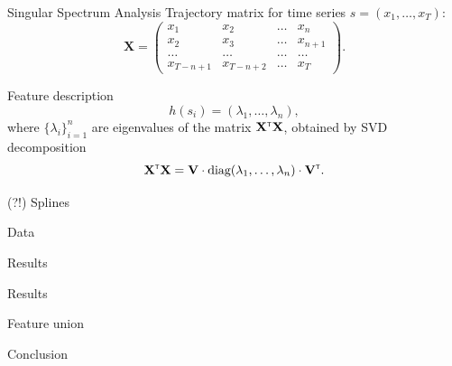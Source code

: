 \documentclass{beamer}
\newcommand{\T}{{\text{\tiny\sffamily\upshape\mdseries T}}}
\begin{document}
\begin{frame}{Singular Spectrum Analysis}
	Trajectory matrix for time series $s = (x_1, \dots, x_T)$:
	\[
		\mathbf{X} = 
		\begin{pmatrix}
			x_1 & x_2 & \dots & x_n \\
			x_2 & x_3 & \dots & x_{n+1} \\
			\dots & \dots & \dots & \dots\\
			x_{T-n+1} & x_{T-n+2} & \dots & x_{T}
		\end{pmatrix}.
	\]
	
	\begin{block}{Feature description}
		\[
			h(s_i) = (\lambda_1, \dots ,\lambda_n),
		\]
		where $\{\lambda_i\}_{i=1}^n$ are eigenvalues of the matrix $\mathbf{X}^{\T} \mathbf{X}$, obtained by SVD decomposition
		\[
			\mathbf{X}^{\T} \mathbf{X} = \mathbf{V} \cdot \text{diag} (\lambda_1, \dots, \lambda_n) \cdot \mathbf{V}^{\T}.
		\]
	\end{block}

\end{frame}
\begin{frame}{(?!) Splines}

\end{frame}
\begin{frame}{Data}

\end{frame}
\begin{frame}{Results}

\end{frame}
\begin{frame}{Results}

\end{frame}
\begin{frame}{Feature union}

\end{frame}
\begin{frame}{Conclusion}

\end{frame}
\end{document}
